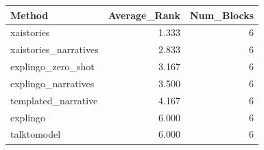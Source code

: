\begin{tabular}{lrr}
\toprule
Method & Average_Rank & Num_Blocks \\
\midrule
xaistories & 1.333 & 6 \\
xaistories_narratives & 2.833 & 6 \\
explingo_zero_shot & 3.167 & 6 \\
explingo_narratives & 3.500 & 6 \\
templated_narrative & 4.167 & 6 \\
explingo & 6.000 & 6 \\
talktomodel & 6.000 & 6 \\
\bottomrule
\end{tabular}

